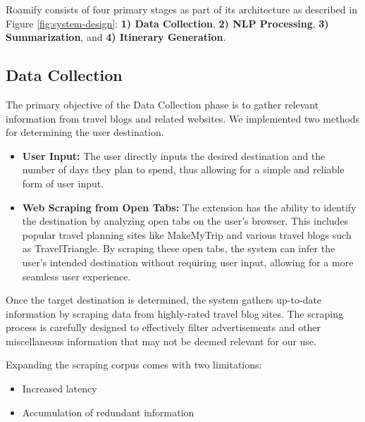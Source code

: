 \documentclass[manuscript,review,anonymous]{acmart}
\begin{document}
    Roamify consists of four primary stages as part of its architecture as described in Figure \ref{fig:system-design}: \textbf{1) Data Collection}, \textbf{2) NLP Processing}, \textbf{3) Summarization}, and \textbf{4) Itinerary Generation}.
    
    \vspace{-7pt}
    
    \subsection{Data Collection}
        The primary objective of the Data Collection phase is to gather relevant information from travel blogs and related websites. We implemented two methods for determining the user destination.
        
        \begin{itemize}
            \item \textbf{User Input:} The user directly inputs the desired destination and the number of days they plan to spend, thus allowing for a simple and reliable form of user input.
            
            \item \textbf{Web Scraping from Open Tabs:} The extension has
            the ability to identify the destination by analyzing open tabs on the user’s browser. This includes popular travel planning sites like MakeMyTrip and various travel blogs such as TravelTriangle. By scraping these open tabs, the system can infer the user’s intended destination without requiring user input, allowing for a more seamless user experience.
        \end{itemize}
        
        Once the target destination is determined, the system gathers up-to-date information by scraping data from highly-rated travel blog sites. The scraping process is carefully designed to effectively filter advertisements and other miscellaneous information that may not be deemed relevant for our use.
        
        Expanding the scraping corpus comes with two limitations:
        \begin{itemize}
            \item Increased latency
            \item Accumulation of redundant information
        \end{itemize}
    
    \vspace{-7pt}
    
\end{document}
